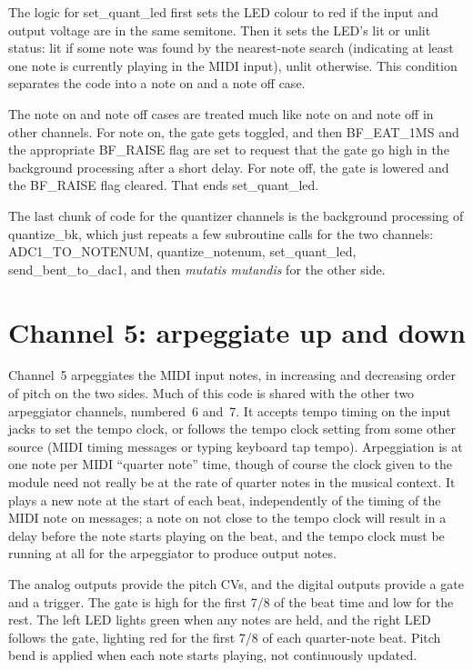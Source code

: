 The logic for set\_quant\_led first sets the LED colour to red if the input
and output voltage are in the same semitone.  Then it sets the LED's lit or
unlit status:  lit if some note was found by the nearest-note search
(indicating at least one note is currently playing in the MIDI input), unlit
otherwise.  This condition separates the code into a note on and a note off
case.

The note on and note off cases are treated much like note on and note off in
other channels.  For note on, the gate gets toggled, and then BF\_EAT\_1MS
and the appropriate BF\_RAISE flag are set to request that the gate go high
in the background processing after a short delay.  For note off, the gate is
lowered and the BF\_RAISE flag cleared.  That ends set\_quant\_led.

The last chunk of code for the quantizer channels is the background
processing of quantize\_bk, which just repeats a few subroutine calls for
the two channels: ADC1\_TO\_NOTENUM, quantize\_notenum, set\_quant\_led,
send\_bent\_to\_dac1, and then \emph{mutatis mutandis} for the other side.

\section{Channel 5:  arpeggiate up and down}

Channel~5 arpeggiates the MIDI input notes, in increasing and decreasing
order of pitch on the two sides.  Much of this code is shared with the other
two arpeggiator channels, numbered~6 and~7.  It accepts tempo timing on the
input jacks to set the tempo clock, or follows the tempo clock setting from
some other source (MIDI timing messages or typing keyboard tap tempo). 
Arpeggiation is at one note per MIDI ``quarter note'' time, though of course
the clock given to the module need not really be at the rate of quarter
notes in the musical context.  It plays a new note at the start of each
beat, independently of the timing of the MIDI note on messages; a note on
not close to the tempo clock will result in a delay before the note starts
playing on the beat, and the tempo clock must be running at all for the
arpeggiator to produce output notes.

The analog outputs provide the pitch CVs, and the digital outputs provide a
gate and a trigger.  The gate is high for the first 7/8 of the beat time and
low for the rest.  The left LED lights green when any notes are held, and
the right LED follows the gate, lighting red for the first 7/8 of each
quarter-note beat.  Pitch bend is applied when each note starts playing, not
continuously updated.

